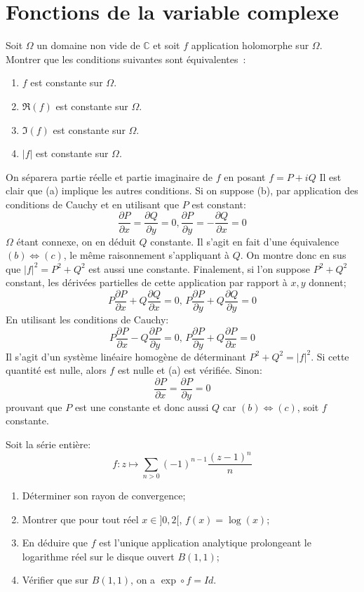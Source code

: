 \documentclass[a4paper, 12pt]{amsart}
\newcommand{\pd}[2]{\ensuremath{\frac{\partial #1}{\partial #2}}}
\begin{document}
\section{Fonctions de la variable complexe}
\begin{fex}
 Soit $\Omega$ un domaine non vide de $\mathbb{C}$ et soit $f$ application
holomorphe sur $\Omega$. Montrer que les conditions suivantes sont
équivalentes~:
\renewcommand{\theenumi}{\alph{enumi}}
\begin{enumerate}
\item $f$ est constante sur $\Omega$.
\item $\Re(f)$ est constante sur $\Omega$.
\item $\Im(f)$ est constante sur $\Omega$.
\item $|f|$ est constante sur $\Omega$.
\end{enumerate}
\end{fex}
On séparera partie réelle et partie imaginaire de $f$ en posant $f=P+iQ$
Il est clair que (a) implique les autres conditions. Si on suppose (b), par
application des conditions de Cauchy et en utilisant que $P$ est constant:
\[
 \pd{P}{x} = \pd{Q}{y} = 0 , \pd{P}{y}=-\pd{Q}{x} = 0
\]
$\Omega$ étant connexe, on en déduit $Q$ constante. Il s'agit en fait d'une
équivalence $(b) \Leftrightarrow (c)$, le même raisonnement s'appliquant à $Q$.
On montre donc en sus que $|f|^2=P^2+Q^2$ est aussi une constante.
Finalement, si l'on suppose $P^2+Q^2$ constant, les dérivées partielles de
cette application par rapport à $x,y$ donnent;
\[
 P\pd{P}{x}+Q\pd{Q}{x}= 0,\,  P\pd{P}{y}+Q\pd{Q}{y}= 0
\]
En utilisant les conditions de Cauchy:
\[
 P\pd{P}{x}-Q\pd{P}{y}= 0,\,  P\pd{P}{y}+Q\pd{P}{x}= 0
\]
Il s'agit d'un système linéaire homogène de déterminant $P^2+Q^2=|f|^2$. Si
cette quantité est nulle, alors $f$ est nulle et (a) est vérifiée. Sinon:
\[
 \pd{P}{x}=\pd{P}{y}=0
\]
prouvant que $P$ est une constante et donc aussi $Q$ car $(b) \Leftrightarrow
(c)$, soit $f$ constante.
\begin{fex}
 Soit la série entière:
\[
f \colon z \mapsto \sum_{n >0}(-1)^{n-1}\frac{(z-1)^n}{n}
\]
\begin{enumerate}
  \item Déterminer son rayon de convergence;
  \item Montrer que pour tout réel $x \in ]0,2[$, $f(x)=\log(x)$;
  \item En déduire que $f$ est l'unique application analytique prolongeant le
  logarithme réel sur le disque ouvert $B(1,1)$;
  \item Vérifier que sur $B(1,1)$, on a $\exp \circ f = Id$.
\end{enumerate}
\end{fex}
\end{document}
